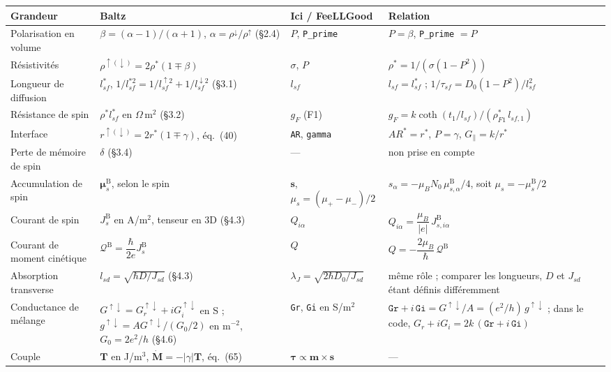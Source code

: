 \documentclass[11pt,a4paper]{article}
\newcommand{\vm}{\bm{m}}
\newcommand{\vs}{\bm{s}}
\begin{document}
\begin{center}
\renewcommand{\arraystretch}{1.35}
\small
\begin{tabular}{>{\raggedright}p{2.6cm}>{\raggedright}p{4.0cm}>{\raggedright}p{2.6cm}>{\raggedright\arraybackslash}p{5.0cm}}
  \toprule
  \textbf{Grandeur} & \textbf{Baltz} & \textbf{Ici / FeeLLGood}
    & \textbf{Relation} \\
  \midrule
  Polarisation en volume
    & $\beta = (\alpha-1)/(\alpha+1)$, $\alpha=\rho^\downarrow/\rho^\uparrow$ (§2.4)
    & $P$, \texttt{P\_prime} & $P=\beta$, \texttt{P\_prime} $=P$ \\
  Résistivités
    & $\rho^{\uparrow(\downarrow)} = 2\rho^*(1\mp\beta)$
    & $\sigma$, $P$ & $\rho^* = 1/\left(\sigma(1-P^2)\right)$ \\
  Longueur de diffusion
    & $l_{sf}^*$, $1/l_{sf}^{*2} = 1/l_{sf}^{\uparrow2}+1/l_{sf}^{\downarrow2}$ (§3.1)
    & $l_{sf}$
    & $l_{sf} = l_{sf}^*$ ; $1/\tau_{sf} = D_0(1-P^2)/l_{sf}^2$ \\
  Résistance de spin
    & $\rho^*l_{sf}^*$ en $\Omega\,$m$^2$ (§3.2)
    & $g_F$ (F1)
    & $g_F = k\coth(t_1/l_{sf})/(\rho_{F1}^*\,l_{sf,1})$ \\
  Interface
    & $r^{\uparrow(\downarrow)} = 2r^*(1\mp\gamma)$, éq.~(40)
    & \texttt{AR}, \texttt{gamma}
    & $AR^* = r^*$, $P=\gamma$, $G_\parallel = k/r^*$ \\
  Perte de mémoire de spin
    & $\delta$ (§3.4) & --- & non prise en compte \\
  Accumulation de spin
    & $\bm{\mu}_s^{\mathrm{B}}$, selon le spin
    & $\vs$, $\mu_s = (\mu_+-\mu_-)/2$
    & $s_\alpha = -\mu_BN_0\,\mu^{\mathrm{B}}_{s,\alpha}/4$,
      soit $\mu_s = -\mu_s^{\mathrm{B}}/2$ \\
  Courant de spin
    & $J_s^{\mathrm{B}}$ en A/m$^2$, tenseur en 3D (§4.3)
    & $Q_{i\alpha}$
    & $Q_{i\alpha} = \dfrac{\mu_B}{|e|}\,J^{\mathrm{B}}_{s,i\alpha}$ \\
  Courant de moment cinétique
    & $\mathcal{Q}^{\mathrm{B}} = \dfrac{\hbar}{2e}J_s^{\mathrm{B}}$
    & $Q$ & $Q = -\dfrac{2\mu_B}{\hbar}\,\mathcal{Q}^{\mathrm{B}}$ \\
  Absorption transverse
    & $l_{sd} = \sqrt{\hbar D/J_{sd}}$ (§4.3)
    & $\lambda_J = \sqrt{2\hbar D_0/J_{sd}}$
    & même rôle ; comparer les longueurs, $D$ et $J_{sd}$ étant définis
      différemment \\
  Conductance de mélange
    & $G^{\uparrow\downarrow} = G_r^{\uparrow\downarrow}+iG_i^{\uparrow\downarrow}$ en S ;
      $g^{\uparrow\downarrow} = AG^{\uparrow\downarrow}/(G_0/2)$ en m$^{-2}$,
      $G_0 = 2e^2/h$ (§4.6)
    & \texttt{Gr}, \texttt{Gi} en S/m$^2$
    & $\texttt{Gr}+i\,\texttt{Gi} = G^{\uparrow\downarrow}/A
      = (e^2/h)\,g^{\uparrow\downarrow}$ ;
      dans le code, $G_r+iG_i = 2k\,(\texttt{Gr}+i\,\texttt{Gi})$ \\
  Couple
    & $\bm{T}$ en J/m$^3$, $\dot{\bm{M}} = -|\gamma|\bm{T}$, éq.~(65)
    & $\bm{\tau}\propto\vm\times\vs$ & --- \\
  \bottomrule
\end{tabular}
\end{center}
\end{document}
